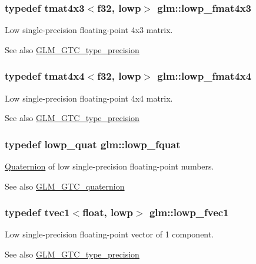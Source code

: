 \subsubsection[{lowp\+\_\+fmat4x3}]{\setlength{\rightskip}{0pt plus 5cm}typedef tmat4x3$<${\bf f32}, lowp$>$ {\bf glm\+::lowp\+\_\+fmat4x3}}\label{namespaceglm_a4a9685a8070dd173dd7d713e185a874c}
Low single-\/precision floating-\/point 4x3 matrix. \begin{DoxySeeAlso}{See also}
\hyperlink{group__gtc__type__precision}{G\+L\+M\+\_\+\+G\+T\+C\+\_\+type\+\_\+precision} 
\end{DoxySeeAlso}
\hypertarget{namespaceglm_ac924479e50d7a275061807b2774a5d28}{}
\subsubsection[{lowp\+\_\+fmat4x4}]{\setlength{\rightskip}{0pt plus 5cm}typedef tmat4x4$<${\bf f32}, lowp$>$ {\bf glm\+::lowp\+\_\+fmat4x4}}\label{namespaceglm_ac924479e50d7a275061807b2774a5d28}
Low single-\/precision floating-\/point 4x4 matrix. \begin{DoxySeeAlso}{See also}
\hyperlink{group__gtc__type__precision}{G\+L\+M\+\_\+\+G\+T\+C\+\_\+type\+\_\+precision} 
\end{DoxySeeAlso}
\hypertarget{namespaceglm_aad1f5b3c348c223fb36e28f646552cff}{}
\subsubsection[{lowp\+\_\+fquat}]{\setlength{\rightskip}{0pt plus 5cm}typedef {\bf lowp\+\_\+quat} {\bf glm\+::lowp\+\_\+fquat}}\label{namespaceglm_aad1f5b3c348c223fb36e28f646552cff}
\hyperlink{class_quaternion}{Quaternion} of low single-\/precision floating-\/point numbers.

\begin{DoxySeeAlso}{See also}
\hyperlink{group__gtc__quaternion}{G\+L\+M\+\_\+\+G\+T\+C\+\_\+quaternion} 
\end{DoxySeeAlso}
\hypertarget{namespaceglm_a2429817c48bcb7e0d489395bba6a6c34}{}
\subsubsection[{lowp\+\_\+fvec1}]{\setlength{\rightskip}{0pt plus 5cm}typedef tvec1$<$float, lowp$>$ {\bf glm\+::lowp\+\_\+fvec1}}\label{namespaceglm_a2429817c48bcb7e0d489395bba6a6c34}
Low single-\/precision floating-\/point vector of 1 component. \begin{DoxySeeAlso}{See also}
\hyperlink{group__gtc__type__precision}{G\+L\+M\+\_\+\+G\+T\+C\+\_\+type\+\_\+precision} 
\end{DoxySeeAlso}
\hypertarget{namespaceglm_aa6bc4e1213ddd2faeec466bdc4b93711}{}
